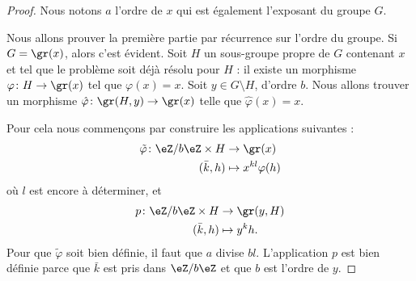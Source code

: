 \begin{proof}
	Nous notons \( a\) l'ordre de \( x\) qui est également l'exposant du groupe \( G\).

	Nous allons prouver la première partie par récurrence sur l'ordre du groupe. Si \( G=\gr(x)\), alors c'est évident. Soit \( H\) un sous-groupe propre de \( G\) contenant \( x\) et tel que le problème soit déjà résolu pour \( H\) : il existe un morphisme \( \varphi\colon H\to \gr(x)\) tel que \( \varphi(x)=x\). Soit \( y\in G\setminus H\), d'ordre \( b\). Nous allons trouver un morphisme $\hat\varphi\colon \gr(H,y)\to \gr(x) $ telle que \( \hat\varphi(x)=x\).

	Pour cela nous commençons par construire les applications suivantes :
	\begin{equation}
		\begin{aligned}
			\tilde \varphi\colon \eZ/b\eZ\times H & \to \gr(x)               \\
			(\bar k,h)                            & \mapsto x^{kl}\varphi(h)
		\end{aligned}
	\end{equation}
	où \( l\) est encore à déterminer, et
	\begin{equation}
		\begin{aligned}
			p\colon \eZ/b\eZ\times H & \to \gr(y,H)  \\
			(\bar k,h)               & \mapsto y^kh.
		\end{aligned}
	\end{equation}
	Pour que \( \tilde \varphi\) soit bien définie, il faut que \( a\) divise \( bl\). L'application \( p\) est bien définie parce que \( \bar k\) est pris dans \( \eZ/b\eZ\) et que \( b\) est l'ordre de \( y\).


\end{proof}

